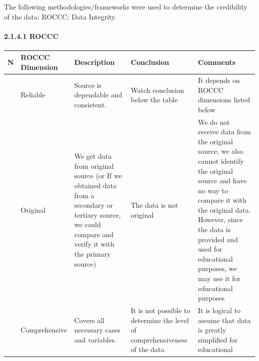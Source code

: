 \documentclass[
]{article}
\begin{document}
The following methodologies/frameworks were used to determine the
credibility of the data: ROCCC; Data Integrity.

\paragraph{2.1.4.1 ROCCC}\label{roccc}

\begin{longtable}[]{@{}
  >{\raggedright\arraybackslash}p{}
  >{\raggedright\arraybackslash}p{}
  >{\raggedright\arraybackslash}p{}
  >{\raggedright\arraybackslash}p{}
  >{\raggedright\arraybackslash}p{}@{}}
\toprule\noalign{}
\begin{minipage}[b]{\linewidth}\raggedright
N
\end{minipage} & \begin{minipage}[b]{\linewidth}\raggedright
ROCCC Dimension
\end{minipage} & \begin{minipage}[b]{\linewidth}\raggedright
Description
\end{minipage} & \begin{minipage}[b]{\linewidth}\raggedright
Conclusion
\end{minipage} & \begin{minipage}[b]{\linewidth}\raggedright
Comments
\end{minipage} \\
\midrule\noalign{}
\endhead
\bottomrule\noalign{}
\endlastfoot
1 & Reliable & Source is dependable and consistent. & Watch conclusion
below the table & It depends on ROCCC dimensions listed below \\
2 & Original & We get data from original source (or If we obtained data
from a secondary or tertiary source, we could compare and verify it with
the primary source) & The data is not original & We do not receive data
from the original source, we also cannot identify the original source
and have no way to compare it with the original data. However, since the
data is provided and used for educational purposes, we may use it for
educational purposes \\
3 & Comprehensive & Covers all necessary cases and variables. & It is
not possible to determine the level of comprehensiveness of the data &
It is logical to assume that data is greatly simplified for educational

\end{longtable}
\end{document}

